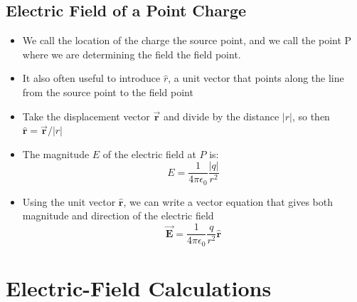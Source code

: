 \documentclass[11pt, a4paper]{article}
\begin{document}
\subsection{Electric Field of a Point Charge}
\begin{itemize}
    \item We call the location of the charge the source point, and we call the point P
        where we are determining the field the field point.
    \item It also often useful to introduce $\hat{r}$, a unit vector that points along
        the line from the source point to the field point
    \item Take the displacement vector $\vec{\mathbf{r}}$ and divide by the distance
        $|r|$, so then $\hat{\mathbf{r}} = \vec{\mathbf{r}} / |r|$
    \item The magnitude $E$ of the electric field at $P$ is:
        \begin{equation}
            E = \frac{1}{4\pi\epsilon_0}\frac{|q|}{r^2}
        \end{equation}
    \item Using the unit vector $\hat{\mathbf{r}}$, we can write a vector equation that
        gives both magnitude and direction of the electric field
        \begin{equation}
            \vec{\mathbf{E}} = \frac{1}{4\pi\epsilon_0}\frac{q}{r^2}\hat{\mathbf{r}}
        \end{equation}
\end{itemize}
\section[21.5 Electric-Field Calculations]{Electric-Field Calculations}
\end{document}
